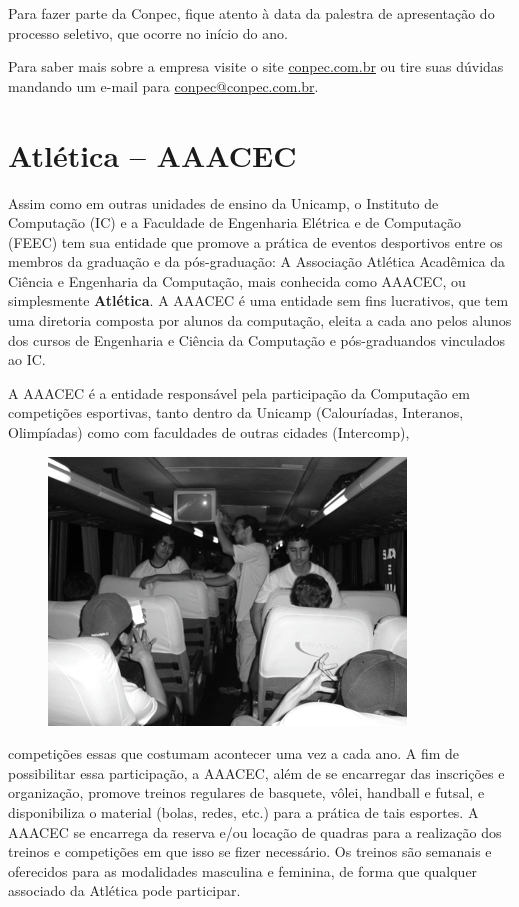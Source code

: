 Para fazer parte da Conpec, fique atento à data da palestra de apresentação do
processo seletivo, que ocorre no início do ano.

Para saber mais sobre a empresa visite o site \url{conpec.com.br} ou
tire suas dúvidas mandando um e-mail para \url{conpec@conpec.com.br}.

\newpage
\section{Atlética -- AAACEC}

Assim como em outras unidades de ensino da Unicamp, o Instituto de Computação
(IC) e a Faculdade de Engenharia Elétrica e de Computação (FEEC) tem sua
entidade que promove a prática de eventos desportivos entre os membros da
graduação e da pós-graduação: A Associação Atlética Acadêmica da Ciência
e Engenharia da Computação, mais conhecida como AAACEC, ou simplesmente
\textbf{Atlética}. A AAACEC é uma entidade sem fins lucrativos, que tem uma
diretoria composta por alunos da computação, eleita a cada ano pelos alunos
dos cursos de Engenharia e Ciência da Computação e pós-graduandos vinculados ao IC.

A AAACEC é a entidade responsável pela participação da Computação em competições
esportivas, tanto dentro da Unicamp (Calouríadas, Interanos, Olimpíadas) como
com faculdades de outras cidades (Intercomp),
\begin{figure}[h!]
    \vspace{-10pt}
    \centering
    \includegraphics[scale=0.75, keepaspectratio=true]{img/imgs/20-aaacec/-096.jpg}
    \vspace{-10pt}
\end{figure}
competições essas que costumam
acontecer uma vez a cada ano. A fim de possibilitar essa participação, a AAACEC,
além de se encarregar das inscrições e organização, promove treinos regulares de
basquete, vôlei, handball e futsal, e disponibiliza o material (bolas, redes,
etc.) para a prática de tais esportes. A AAACEC se encarrega da reserva e/ou
locação de quadras para a realização dos treinos e competições em que isso se
fizer necessário. Os treinos são semanais e oferecidos para as modalidades
masculina e feminina, de forma que qualquer associado da Atlética pode
participar.


